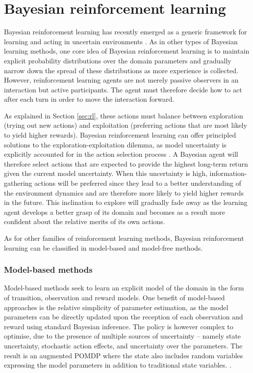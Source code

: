 \section{Bayesian reinforcement learning}
\label{sec:brl}

Bayesian reinforcement learning has recently emerged as a generic framework for learning and acting in uncertain environments \citep{poupart2008,Ross:2011,brl2012}. As in other types of Bayesian learning methods, one core idea of Bayesian reinforcement learning is to maintain explicit probability distributions over the domain parameters and gradually narrow down the spread of these distributions as more experience is collected. However, reinforcement learning agents are not merely passive observers in an interaction but active participants.  The agent must therefore decide how to act after each turn in order to move the interaction forward. 

As explained in Section \ref{sec:rl}, these actions must balance between exploration (trying out new actions) and exploitation (preferring actions that are most likely to yield higher rewards). Bayesian reinforcement learning can offer principled solutions to the exploration-exploitation dilemma, as model uncertainty is explicitly accounted for in the action selection process \citep{Duff:2002,Ross:2011}.  A Bayesian agent will therefore select actions that are expected to provide the highest long-term return given the current model uncertainty. When this uncertainty is high, information-gathering actions will be preferred since they lead to a better understanding of the environment dynamics and are therefore more likely to yield higher rewards in the future. This inclination to explore will gradually fade away as the learning agent develops a better grasp of its domain and becomes as a result more confident about the relative merits of its own actions.

As for other families of reinforcement learning methods, Bayesian reinforcement learning can be classified in model-based and model-free methods. 


\subsubsection*{Model-based methods}

Model-based methods seek to learn an explicit model of the domain in the form of transition, observation and reward models.  One benefit of model-based approaches is the relative simplicity of parameter estimation, as the model parameters can be directly updated upon the reception of each observation and reward using standard Bayesian inference. The policy is however complex to optimise, due to the presence of multiple sources of uncertainty -- namely state uncertainty, stochastic action effects, and uncertainty over the parameters. The result is an augmented POMDP where the state also includes random variables expressing the model parameters in addition to traditional state variables. \citep{Duff:2002,Ross:2011}. 

